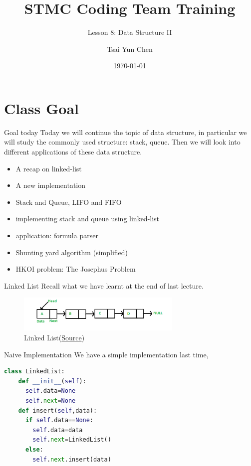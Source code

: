 \documentclass[10pt,xcolor={table,dvipsnames},t]{beamer}
\title[Your Short Title]{STMC Coding Team Training}
\subtitle{Lesson 8: Data Structure II}
\author{Tsai Yun Chen}
\date{\today}
\begin{document}
\begin{frame}
  \titlepage
\end{frame}


\section{Class Goal}

\begin{frame}{Goal today}
Today we will continue the topic of data structure, in particular we will study the commonly used structure: stack, queue. Then we will look into different applications of these data structure.
\begin{itemize}
  \item A recap on linked-list
  \item A new implementation
  \item Stack and Queue, LIFO and FIFO
  \item implementing stack and queue using linked-list
  \item application: formula parser
  \item Shunting yard algorithm (simplified)
  \item HKOI problem: The Josephus Problem
\end{itemize}
\end{frame}

\begin{frame}{Linked List}
  Recall what we have learnt at the end of last lecture.
  \begin{figure}[h!]
    \includegraphics[width=0.7\textwidth]{img/Linkedlist.png}
    \caption{Linked List(\href{https://www.geeksforgeeks.org/data-structures/linked-list/}{Source})}
  \end{figure}
\end{frame}

\begin{frame}[fragile]{Naive Implementation}
  We have a simple implementation last time,
\begin{lstlisting}[language=python]
  class LinkedList:
    def __init__(self):
      self.data=None
      self.next=None
    def insert(self,data):
      if self.data==None:
        self.data=data
        self.next=LinkedList()
      else:
        self.next.insert(data)
\end{lstlisting}
\end{frame}
\end{document}
